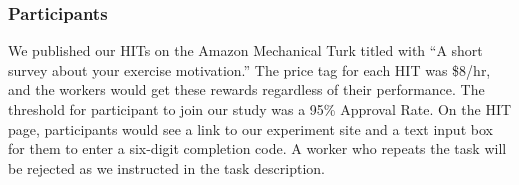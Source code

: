 \subsubsection{Participants}
We published our HITs on the Amazon Mechanical Turk titled with ``A short survey about your exercise motivation.'' The price tag for each HIT was \$8/hr, and the workers would get these rewards regardless of their performance. The threshold for participant to join our study was a 95\% Approval Rate. On the HIT page, participants would see a link to our experiment site and a text input box for them to enter a six-digit completion code. A worker who repeats the task will be rejected as we instructed in the task description.
